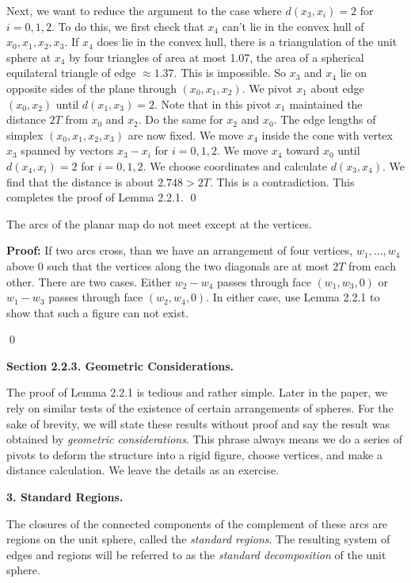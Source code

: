 Next, we want to reduce the argument to the case where 
$d(x_3,x_i)=2$ for $i=0,1,2$.  To do this, we first check that 
$x_4$ can't lie in the convex hull of $x_0,x_1,x_2,x_3$.  If $x_4$ does lie 
in the convex hull, there is a triangulation of the unit sphere at $x_4$ 
by four triangles of area at most 1.07, the area of a spherical
equilateral triangle 
of edge $\approx 1.37$.   This is impossible.  So $x_3$ and $x_4$ lie on opposite sides 
of the plane through $(x_0,x_1,x_2)$.  We pivot $x_1$ about edge $(x_0,x_2)$ until 
$d(x_1,x_3)=2$.  Note that in this pivot $x_1$ maintained the distance $2T$ 
from $x_0$ and $x_2$.  Do the same for $x_2$ and $x_0$.  The edge lengths of 
simplex $(x_0,x_1,x_2,x_3)$ are now fixed.  We move $x_4$ inside the cone 
with vertex $x_3$ spanned by vectors $x_3-x_i$ for $i=0,1,2$.  
We move $x_4$ toward $x_0$ until $d(x_4,x_i)=2$ for $i=0,1,2$.  We choose coordinates
and calculate $d(x_3,x_4)$.  We find that the distance is about $2.748 > 2T$.
This is a contradiction.  This completes the proof of Lemma 2.2.1. \qed

 The arcs of the planar map do not meet except at the vertices.  \endproclaim

{\bf Proof:} If two arcs cross, than we have an arrangement of four vertices, 
$w_1,\dots,w_4$
 above $0$ such that the vertices along the two diagonals are at most $2T$ from each other.
There are two cases.  Either $w_2-w_4$ passes through face $(w_1,w_3,0)$ or $w_1-w_3$ 
passes through face $(w_2,w_4,0)$.  In either case, use Lemma 2.2.1 to show that such a figure 
can not exist.  

\qed


\bigskip

{\bf Section 2.2.3. Geometric Considerations.}

\bigskip
The proof of Lemma 2.2.1 is tedious and rather simple.  Later in the paper, we rely on similar tests of the existence of certain arrangements of spheres.  For the sake of brevity, we will state these results without proof and say the result was obtained by {\it geometric considerations}.  This phrase always means we do a series of pivots to deform the structure into a rigid figure, choose vertices, and make a distance calculation.  We leave the details as an exercise.


\bigskip

\centerline{ { \bf 3. Standard Regions.}}

\bigskip

The closures of the connected components of the complement of these arcs are regions 
on the unit sphere, called the {\it standard regions}. 
 The resulting system of edges and regions will be 
referred to as the {\it standard decomposition} of the unit sphere.



